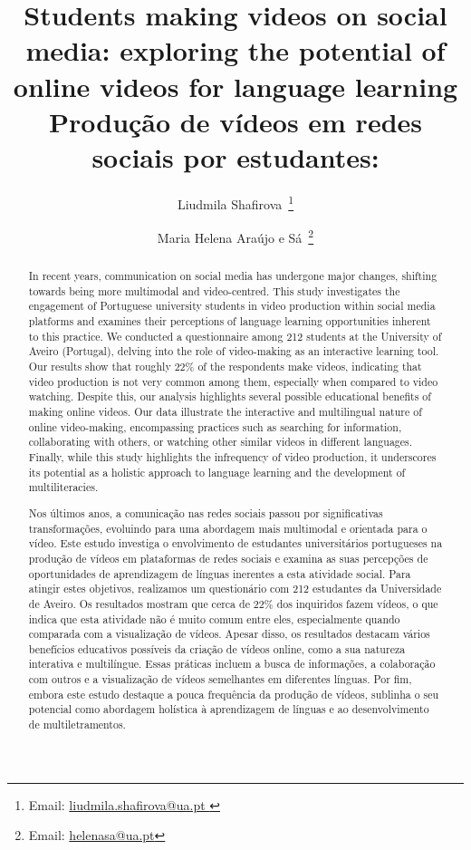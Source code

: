 \documentclass[english]{textolivre}
\title{Students making videos on social media: exploring the potential of online videos for language learning
	Produção de vídeos em redes sociais por estudantes:}
\author[1]{Liudmila Shafirova~\orcid{0000-0003-3743-2029}\thanks{Email: \href{mailto:liudmila.shafirova@ua.pt }{liudmila.shafirova@ua.pt }}}
\author[1]{Maria Helena Araújo e Sá~\orcid{0000-0002-6623-9642}\thanks{Email: \href{mailto:helenasa@ua.pt}{helenasa@ua.pt}}}
\affil[1]{University of Aveiro, Department of Education and Psychology, Aveiro, Aveiro, Portugal.}
\begin{document}
	
\maketitle
\begin{polyabstract}

\begin{abstract}
In recent years, communication on social media has undergone major changes, shifting towards being more multimodal and video-centred. This study investigates the engagement of Portuguese university students in video production within social media platforms and examines their perceptions of language learning opportunities inherent to this practice. We conducted a questionnaire among 212 students at the University of Aveiro (Portugal), delving into the role of video-making as an interactive learning tool. Our results show that roughly 22\% of the respondents make videos, indicating that video production is not very common among them, especially when compared to video watching. Despite this, our analysis highlights several possible educational benefits of making online videos. Our data illustrate the interactive and multilingual nature of online video-making, encompassing practices such as searching for information, collaborating with others, or watching other similar videos in different languages. Finally, while this study highlights the infrequency of video production, it underscores its potential as a holistic approach to language learning and the development of multiliteracies.


\end{abstract}

\begin{portuguese}
\begin{abstract}
Nos últimos anos, a comunicação nas redes sociais passou por significativas transformações, evoluindo para uma abordagem mais multimodal e orientada para o vídeo. Este estudo investiga o envolvimento de estudantes universitários portugueses na produção de vídeos em plataformas de redes sociais e examina as suas percepções de oportunidades de aprendizagem de línguas inerentes a esta atividade social. Para atingir estes objetivos, realizamos um questionário com 212 estudantes da Universidade de Aveiro. Os resultados mostram que cerca de 22\% dos inquiridos fazem vídeos, o que indica que esta atividade não é muito comum entre eles, especialmente quando comparada com a visualização de vídeos. Apesar disso, os resultados destacam vários benefícios educativos possíveis da criação de vídeos online, como a sua natureza interativa e multilíngue. Essas práticas incluem a busca de informações, a colaboração com outros e a visualização de vídeos semelhantes em diferentes línguas. Por fim, embora este estudo destaque a pouca frequência da produção de vídeos, sublinha o seu potencial como abordagem holística à aprendizagem de línguas e ao desenvolvimento de multiletramentos.


\end{abstract}
\end{portuguese}
\end{polyabstract}
\end{document}
